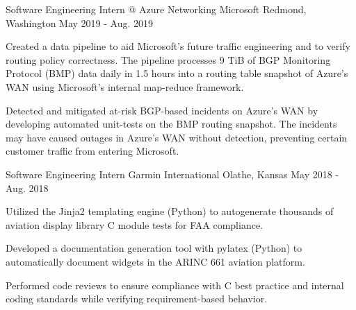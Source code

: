 

\begin{cventries}

\cventry
  {Software Engineering Intern @ Azure Networking} %
  {Microsoft} %
  {Redmond, Washington} %
  {May 2019 - Aug. 2019} %
  {
    \begin{cvitems} %
      \item {Created a data pipeline to aid Microsoft's future traffic
             engineering and to verify routing policy correctness. The pipeline
             processes 9 TiB of BGP Monitoring Protocol (BMP) data daily in 1.5 hours
             into a routing table snapshot of Azure's WAN using Microsoft's internal
             map-reduce framework.}
      \item{Detected and mitigated at-risk BGP-based incidents on Azure's WAN by
            developing automated unit-tests on the BMP routing snapshot.  The
            incidents may have caused outages in Azure's WAN without detection,
            preventing certain customer traffic from entering Microsoft.}
    \end{cvitems}
  }


\cventry
  {Software Engineering Intern} %
  {Garmin International} %
  {Olathe, Kansas} %
  {May 2018 - Aug. 2018} %
  {
    \begin{cvitems} %
      \item {Utilized the Jinja2 templating engine (Python) to autogenerate
        thousands of aviation display library C module tests for FAA
        compliance.}
      \item {Developed a documentation generation tool with pylatex (Python) to
        automatically document widgets in the ARINC 661 aviation platform.}
      \item {Performed code reviews to ensure compliance with C best practice
        and internal coding standards while verifying requirement-based behavior.}
    \end{cvitems}
  }


\end{cventries}
